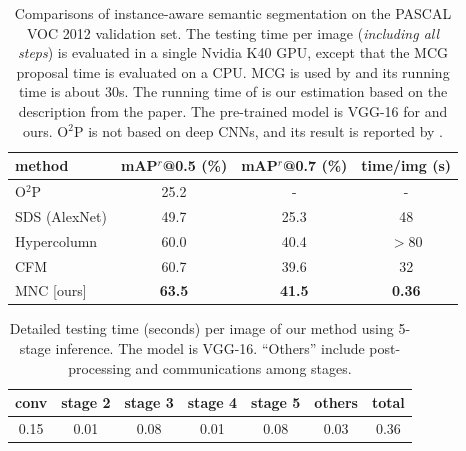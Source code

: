 \documentclass[10pt,twocolumn,letterpaper]{article}
\begin{document}
\setlength{\tabcolsep}{2pt}
\renewcommand{\arraystretch}{1.05}
\begin{table}[t]
\begin{center}
\small
\begin{tabular}{l|c|c|c}
method &\footnotesize mAP$^{r}$@0.5 (\%) &\footnotesize mAP$^{r}$@0.7 (\%) &\footnotesize time/img (s) \\
\hline
O$^2$P \cite{Carreira2012} & 25.2 & - & - \\
SDS (AlexNet) \cite{Hariharan2014} & 49.7 & 25.3 & 48 \\
Hypercolumn \cite{Hariharan2015} & 60.0 & 40.4 & $>$80 \\
CFM \cite{Dai2015} & 60.7 & 39.6 & 32 \\
\hline
MNC [ours] & \textbf{63.5} & \textbf{41.5} & \textbf{0.36} \\
\end{tabular}	
\end{center}
\vspace{-.5em}
\caption{Comparisons of instance-aware semantic segmentation on the PASCAL VOC 2012 validation set. The testing time per image (\emph{including all steps}) is evaluated in a single Nvidia K40 GPU, except that the MCG \cite{Arbelaez2014} proposal time is evaluated on a CPU. MCG is used by \cite{Hariharan2014,Hariharan2015,Dai2015} and its running time is about 30s. The running time of \cite{Hariharan2015} is our estimation based on the description from the paper.
The pre-trained model is VGG-16 for \cite{Hariharan2015,Dai2015} and ours. O$^2$P is not based on deep CNNs, and its result is reported by \cite{Hariharan2014}.}
\label{tab:voc_result}
\end{table}

\setlength{\tabcolsep}{6pt}
\renewcommand{\arraystretch}{1.05}
\begin{table}[t]
\begin{center}
\small
\begin{tabular}{cccccc|c}
conv & stage 2 & stage 3 & stage 4 & stage 5 & others & total \\
\hline
0.15 & 0.01 & 0.08 & 0.01 & 0.08 & 0.03 & 0.36 \\
\end{tabular}	
\end{center}
\vspace{-1em}
\caption{Detailed testing time (seconds) per image of our method using 5-stage inference. The model is VGG-16. ``Others'' include post-processing and communications among stages.}
\label{tab:time}
\end{table}
\end{document}

